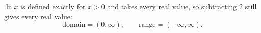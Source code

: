 $\ln x$ is defined exactly for $x>0$ and takes every real value, so subtracting $2$ still gives every real value:
\[\text{domain}=\boxed{(0,\infty)},\qquad\text{range}=\boxed{(-\infty,\infty)}.\]

